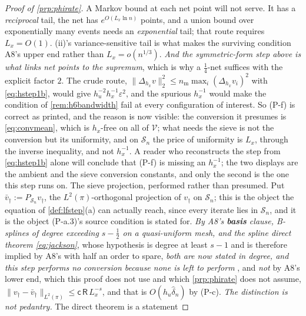 \begin{proof}[Proof of \cref{prp:phirate}]
A Markov bound at each net point will not serve. It has a \emph{reciprocal} tail, the net has
$e^{O(L_x\ln n)}$ points, and a union bound over
exponentially many events needs an \emph{exponential} tail; that route requires $L_x=O(1)$.
(ii)'s variance-sensitive tail is what makes the surviving condition
A8's upper end rather than $L_x=o(n^{1/3})$. \emph{And the symmetric-form step above is what links net
points to the supremum}, which is why a $\tfrac14$-net suffices with the explicit factor $2$.
The crude route, $\|\Delta_{h_x}v\|_2^{2}\le n_{\mathrm m}\max_i(\Delta_{h_x}v_i)^{2}$ with
\eqref{eq:hstep1b}, would give $h_u^{-2}h_x^{-1}\varepsilon^{2}$, and the spurious $h_x^{-1}$ would
make the condition of \cref{rem:h6bandwidth} fail at every configuration of interest. So (P-f) is
correct as printed, and the reason is now visible: the conversion it presumes is \eqref{eq:convmean},
which is $h_x$-free on all of $\mathcal V$; what needs the sieve is not the conversion but its
uniformity, and on $\mathcal S_n$ the price of uniformity is $L_x$, through the inverse inequality, 
and not $h_x^{-1}$. A reader who reconstructs the step from \eqref{eq:hstep1b} alone will conclude
that (P-f) is missing an $h_x^{-1}$; the two displays are the ambient and the sieve conversion constants,
and only the second is the one this step runs on.
The sieve projection, performed rather than presumed. Put $\bar v_\dagger:=P_{\mathcal S_n}v_\dagger$,
the $L^{2}(\pi)$-orthogonal projection of $v_\dagger$ on $\mathcal S_n$; this is the object the equation
of \cref{def:lfstep}(a) can actually reach, since every iterate lies in $\mathcal S_n$, and it is the
object (P-a.3)'s source condition is stated for. \emph{By A8's \textbf{basis} clause, B-splines of
degree exceeding $s-\tfrac12$ on a quasi-uniform mesh, and the spline direct theorem \eqref{eq:jackson}},
whose hypothesis is degree at least $s-1$ and is therefore implied by A8's with half an order to spare, 
\emph{both are now stated in degree, and this step performs no conversion because none is left to perform}
, and \emph{not} by A8's lower end, which this proof does not use and which \cref{prp:phirate} does not
assume,
$\|v_\dagger-\bar v_\dagger\|_{L^{2}(\pi)}\le\mathsf c\,\mathsf R\,L_x^{-s}$, and that is
$O(h_u\hat\delta_n)$ by (P-c). \emph{The distinction is not pedantry.} The direct theorem is a statement

\end{proof}
